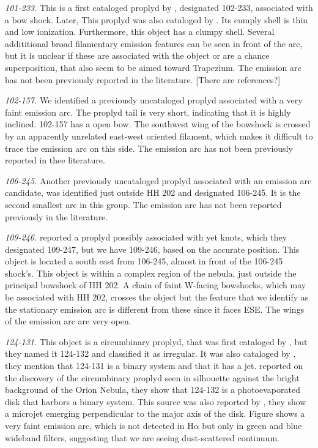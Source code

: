 \documentclass[iop, apj]{emulateapj}
\newcommand\ha{\ensuremath{\mathrm{H\alpha}}}
\begin{document}
\textit{101-233.} This is a first cataloged proplyd by \citet{ODell:1996a}, designated 102-233, associated with a bow shock. Later, This proplyd was also cataloged by \citet{Ricci:2008a}. Its cumply shell is thin and low ionization. Furthermore, this object has a clumpy shell. Several addititional broad filamentary emission features can be seen in front of the arc, but it is unclear if these are associated with the object or are a chance superposition, that also seem to be aimed toward Trapezium. The emission arc has not been previously reported in the literature. [There are references?]   

\textit{102-157.} We identified a previously uncataloged proplyd associated with a very faint emission arc. The proplyd tail is very short, indicating that it is highly inclined. 102-157 has a open bow. The southwest wing of the bowshock is crossed by an apparently unrelated east-west oriented filament, which makes it difficult to trace the emission arc on this side. The emission arc has not been previously reported in thee literature. 

\textit{106-245.} Another previously uncataloged proplyd associated with an emission arc candidate, was identified just outside HH 202 and designated 106-245. It is the second smallest arc in this group. The emission arc has not been reported previously in the literature. 

\textit{109-246.} \citet{Bally:2000a} reported a proplyd possibly associated with yet knots, which they designated 109-247, but we have 109-246, based on the accurate position. This object is located a south east from 106-245, almost in front of the 106-245 shock's. This object is within a complex region of the nebula, just outside the principal bowshock of HH 202. A chain of faint W-facing bowshocks, which may be associated with HH 202, crosses the object but the feature that we identify as the stationary emission arc is different from these since it faces ESE. The wings of the emission arc are very open.    

\textit{124-131.} This object is a circumbinary proplyd, that  was first cataloged by \citet{ODell:1996a}, but they named it 124-132 and classified it as irregular. It was also cataloged by \citet{Ricci:2008a}, they mention that 124-131 is a binary system and that it has a jet. \citet{Robberto:2008a} reported on the discovery of the circumbinary proplyd seen in silhouette against the bright background of the Orion Nebula, they show that 124-132 is a photoevaporated disk that harbors a binary system. This source was also reported by \citet{Smith:2005a}, they show a microjet emerging perpendicular to the major axis of the disk. Figure shows a very faint emission arc, which is not detected in \ha{} but only in green and blue wideband filters, suggesting that we are seeing dust-scattered continuum.
 
\end{document}
